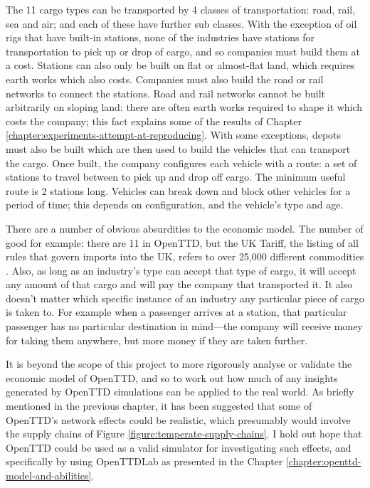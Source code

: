 \documentclass[logo,msc,dsti]{style/infthesis}    %
\begin{document}
{The 11 cargo types can be transported by 4 classes of transportation: road, rail, sea and air; and each of these have further sub classes. With the exception of oil rigs that have built-in stations, none of the industries have stations for transportation to pick up or drop of cargo, and so companies must build them at a cost. Stations can also only be built on flat or almost-flat land, which requires earth works which also costs. Companies must also build the road or rail networks to connect the stations. Road and rail networks cannot be built arbitrarily on sloping land: there are often earth works required to shape it which costs the company; this fact explains some of the results of Chapter \ref{chapter:experiments-attempt-at-reproducing}. With some exceptions, depots must also be built which are then used to build the vehicles that can transport the cargo. Once built, the company configures each vehicle with a route: a set of stations to travel between to pick up and drop off cargo. The minimum useful route is 2 stations long. Vehicles can break down and block other vehicles for a period of time; this depends on configuration, and the vehicle's type and age.

There are a number of obvious absurdities to the economic model. The number of good for example: there are 11 in OpenTTD, but the UK Tariff, the listing of all rules that govern imports into the UK, refers to over 25,000 different commodities \cite{uktariff}. Also, as long as an industry's type can accept that type of cargo, it will accept any amount of that cargo and will pay the company that transported it. It also doesn't matter which specific instance of an industry any particular piece of cargo is taken to. For example when a passenger arrives at a station, that particular passenger has no particular destination in mind---the company will receive money for taking them anywhere, but more money if they are taken further.

It is beyond the scope of this project to more rigorously analyse or validate the economic model of OpenTTD, and so to work out how much of any insights generated by OpenTTD simulations can be applied to the real world. As briefly mentioned in the previous chapter, it has been suggested that some of OpenTTD's network effects could be realistic, which presumably would involve the supply chains of Figure \ref{figure:temperate-supply-chains}. I hold out hope that OpenTTD could be used as a valid simulator for investigating such effects, and specifically by using OpenTTDLab as presented in the Chapter \ref{chapter:openttd-model-and-abilities}.

}
\end{document}
